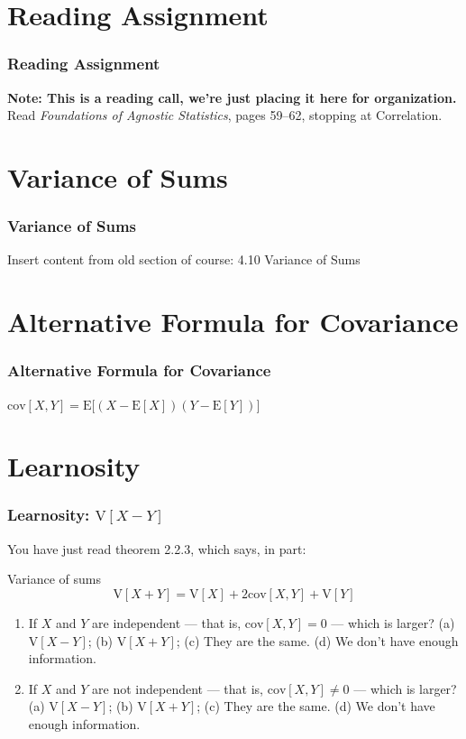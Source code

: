 \documentclass[12pt, block=fill]{beamer}
\newcommand{\E}{\text{E}}
\newcommand{\V}{\text{V}}
\newcommand{\cov}{\text{cov}}
\newcommand{\paul}[1]{{\color{red}#1}}
\begin{document}
\section{Reading Assignment} 
 
\begin{frame}
  \frametitle{Reading Assignment}
  \textbf{Note: This is a reading call, we're just placing it here for
    organization.}  Read \textit{Foundations of Agnostic Statistics}, pages
  59–62, stopping at Correlation.
\end{frame}


\section{Variance of Sums}
\begin{frame}
  \frametitle{Variance of Sums}
  \paul{Insert content from old section of course: 4.10 Variance of Sums}
\end{frame}

\section{Alternative Formula for Covariance}

\begin{frame}[t]
  \frametitle{Alternative Formula for Covariance}
$\cov[X,Y] = \E \big[ (X-\E[X])(Y-\E[Y]) \big]$
\end{frame}

 \section{Learnosity}

 \begin{frame}
   \frametitle{Learnosity: $\V[X - Y]$}
   You have just read theorem 2.2.3, which says, in part:
   \begin{block}{Variance of sums}
     $$\V[X + Y] = \V[X] + 2 \cov[X,Y] + \V[Y]$$
   \end{block}

   \begin{enumerate}
   \item If $X$ and $Y$ are independent — that is, $\cov[X,Y] = 0$ —
     which is larger? (a) $\V[X-Y]$; (b) $\V[X+Y]$; (c) They are the
     same. (d) We don't have enough information.
   \item If $X$ and $Y$ are not independent — that is,
     $\cov[X,Y] \neq 0$ — which is larger? (a) $\V[X-Y]$; (b) $\V[X+Y]$;
     (c) They are the same. (d) We don't have enough information.
   \end{enumerate}
 \end{frame}
\end{document}
